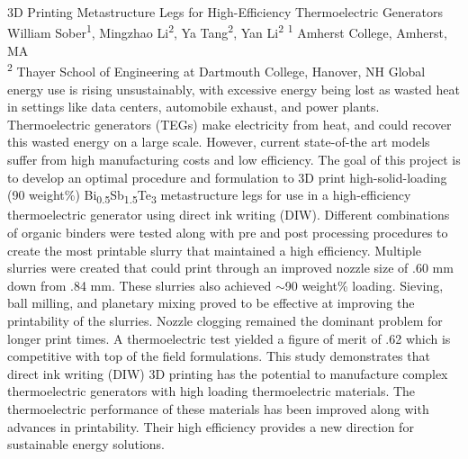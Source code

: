 \makeabstract
    {
    3D Printing Metastructure Legs for High-Efficiency Thermoelectric Generators
    }
    {
    William Sober\textsuperscript{1}, Mingzhao Li\textsuperscript{2}, Ya Tang\textsuperscript{2}, Yan Li\textsuperscript{2}
    }
    {
    \textsuperscript{1} Amherst College, Amherst, MA\\
\textsuperscript{2} Thayer School of Engineering at Dartmouth College, Hanover, NH
    }
    {
    Global energy use is rising unsustainably, with excessive energy being lost as wasted heat in settings like data centers, automobile exhaust, and power plants. Thermoelectric generators (TEGs) make electricity from heat, and could recover this wasted energy on a large scale. However, current state-of-the art models suffer from high manufacturing costs and low efficiency. The goal of this project is to develop an optimal procedure and formulation to 3D print high-solid-loading (90 weight\%) Bi\textsubscript{0.5}Sb\textsubscript{1.5}Te\textsubscript{3} metastructure legs for use in a high-efficiency thermoelectric generator using direct ink writing (DIW). 
    }
    {
    Different combinations of organic binders were tested along with pre and post processing procedures to create the most printable slurry that maintained a high efficiency.
    }
    {
    Multiple slurries were created that could print through an improved nozzle size of .60 mm down from .84 mm. These slurries also achieved $\sim$90 weight\% loading. Sieving, ball milling, and planetary mixing proved to be effective at improving the printability of the slurries. Nozzle clogging remained the dominant problem for longer print times. A thermoelectric test yielded a figure of merit of .62 which is competitive with top of the field formulations. 
    }
    {
    This study demonstrates that direct ink writing (DIW) 3D printing has the potential to manufacture complex thermoelectric generators with high loading thermoelectric materials. The thermoelectric performance of these materials has been improved along with advances in printability. Their high efficiency provides a new direction for sustainable energy solutions.
    }

    \newpage
    
